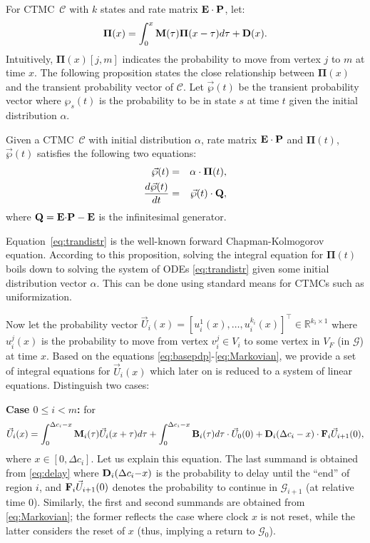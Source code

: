 \documentclass{LMCS}
\newcommand{\mc}[1]{\mathcal{#1}}
\newcommand{\<}{\langle}
\renewcommand{\>}{\rangle}
\newcommand{\les}{\leqslant}
\newcommand{\mG}{\mathcal{G}}
\newcommand{\CTMC}{\textsc{{CTMC}}}
\newcommand{\ODE}{\textsc{ODE}}
\newcommand{\bdD}{{\bf D}}
\newcommand{\bdE}{{\bf E}}
\newcommand{\bdF}{{\bf F}}
\newcommand{\bdB}{{\bf B}}
\newcommand{\bdM}{{\bf M}}
\newcommand{\bdPi}{\mathbf{\Pi}}
\renewcommand{\P}{{\bf P}}
\newcommand{\Q}{{\bf Q}}
\newcommand{\Reals}{\mathbb{R}}
\begin{document}
For \CTMC\ $\mc{C}$ with $k$ states and rate matrix $\bdE \cdot \P$, let:
\begin{equation}
\bdPi(x) =\int_{0}^{x}\bdM(\tau)\bdPi(x-\tau)d\tau+\bdD(x).
\end{equation}
Intuitively, $\bdPi(x)[j,m]$ indicates the probability to move from vertex $j$
to $m$ at time $x$.
The following proposition states the close relationship between $\bdPi(x)$
and the transient probability vector of $\mc{C}$.
Let $\vec{\wp}(t)$ be the transient probability vector where $\wp_s(t)$ is the
probability to be in state $s$ at time $t$ given the initial distribution $\alpha$.

\begin{prop}\label{prop:pi2tran}
Given a \CTMC\ $\mc{C}$ with initial distribution $\alpha$, rate
matrix $\bdE \cdot \P$ and $\bdPi(t)$, $\vec{\wp}(t) $ satisfies
the following two equations:
\begin{eqnarray}
\vec{\wp}(t)&=&\alpha\cdot\bdPi(t),\\
\frac{d\vec{\wp}(t)}{dt}&=&\vec{\wp}(t)\cdot\Q,\label{eq:trandistr}
\end{eqnarray}
where $\Q=\bdE{\cdot}\P-\bdE$ is the infinitesimal generator.
\end{prop}

Equation~\eqref{eq:trandistr} is the well-known forward Chapman-Kolmogorov equation.
According to this proposition, solving the integral equation for $\bdPi(t)$ boils down to
solving the system of \ODE s \eqref{eq:trandistr} given some initial distribution vector
$\alpha$.
This can be done using standard means for CTMCs such as uniformization.

Now let the probability vector $\vec{U}_i(x) = {[u_i^{1}(x), \dots, u_i^{k_i}(x)]}^{\top}
\in\Reals^{k_i \times 1}$ where $u_i^{j}(x)$ is the probability to move from vertex
$v_{i}^j \in V_i$ to some vertex in $V_F$ (in $\mG$) at time $x$.
Based on the equations \eqref{eq:basepdp}-\eqref{eq:Markovian}, we provide a set of
integral equations for $\vec{U}_i(x)$ which later on is reduced to a system of linear
equations.
Distinguish two cases:

\medskip
\noindent\textbf{Case $0\les i<m$: } for
\begin{equation}\label{eq:delay_m}
\vec{U}_i(x)= \int_{0}^{\Delta
c_i-x}\bdM_i(\tau)\vec{U}_i(x+\tau)d\tau+\int_{0}^{\Delta
c_i-x}\bdB_i(\tau)d\tau\cdot\vec{U}_0(0) +\bdD_i(\Delta
c_i-x)\cdot \bdF_i\vec{U}_{i+1}(0),
\end{equation}
where $x\in[0,\Delta c_i]$.  Let us explain this equation. The last summand is
obtained from \eqref{eq:delay} where $\bdD_i(\Delta c_i{-}x)$ is the probability
to delay until the ``end'' of region $i$, and $\bdF_i\vec{U}_{i{+}1}(0)$ denotes
the probability to continue in $\mG_{i+1}$ (at relative time $0$).
Similarly, the first and second summands are obtained from \eqref{eq:Markovian};
the former reflects the case where clock $x$ is not reset, while the latter considers
the reset of $x$ (thus, implying a return to $\mG_0$).
\end{document}
